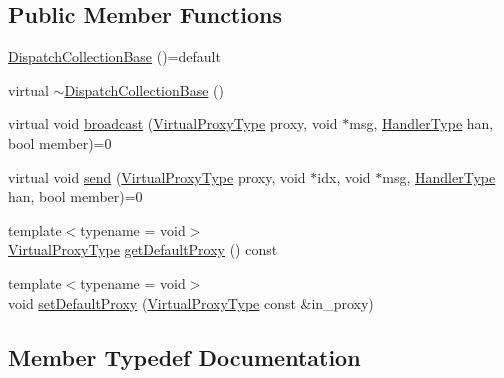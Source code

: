 \subsection*{Public Member Functions}
\begin{DoxyCompactItemize}
\item 
\hyperlink{structvt_1_1vrt_1_1collection_1_1_dispatch_collection_base_a96f6594a04faa4519a553b18bf2b2e6d}{Dispatch\+Collection\+Base} ()=default
\item 
virtual \hyperlink{structvt_1_1vrt_1_1collection_1_1_dispatch_collection_base_a8c27f42a9b91fd31b0aa7b30da4d614c}{$\sim$\+Dispatch\+Collection\+Base} ()
\item 
virtual void \hyperlink{structvt_1_1vrt_1_1collection_1_1_dispatch_collection_base_aa2f5d59eefb10ba8c7ba2432efff9ad3}{broadcast} (\hyperlink{namespacevt_a1b417dd5d684f045bb58a0ede70045ac}{Virtual\+Proxy\+Type} proxy, void $\ast$msg, \hyperlink{namespacevt_af64846b57dfcaf104da3ef6967917573}{Handler\+Type} han, bool member)=0
\item 
virtual void \hyperlink{structvt_1_1vrt_1_1collection_1_1_dispatch_collection_base_a207db071c213e894568a8b7ff217cd58}{send} (\hyperlink{namespacevt_a1b417dd5d684f045bb58a0ede70045ac}{Virtual\+Proxy\+Type} proxy, void $\ast$idx, void $\ast$msg, \hyperlink{namespacevt_af64846b57dfcaf104da3ef6967917573}{Handler\+Type} han, bool member)=0
\item 
{\footnotesize template$<$typename  = void$>$ }\\\hyperlink{namespacevt_a1b417dd5d684f045bb58a0ede70045ac}{Virtual\+Proxy\+Type} \hyperlink{structvt_1_1vrt_1_1collection_1_1_dispatch_collection_base_a7ff0d68977083eb225da837b6a8cef7d}{get\+Default\+Proxy} () const
\item 
{\footnotesize template$<$typename  = void$>$ }\\void \hyperlink{structvt_1_1vrt_1_1collection_1_1_dispatch_collection_base_a3c5ad977c57108fdcfcc3c2b443428e3}{set\+Default\+Proxy} (\hyperlink{namespacevt_a1b417dd5d684f045bb58a0ede70045ac}{Virtual\+Proxy\+Type} const \&in\+\_\+proxy)
\end{DoxyCompactItemize}


\subsection{Member Typedef Documentation}
\mbox{\label{structvt_1_1vrt_1_1collection_1_1_dispatch_collection_base_a637f8dbdc7970f9991e98e43ff4cf2fe}} 
